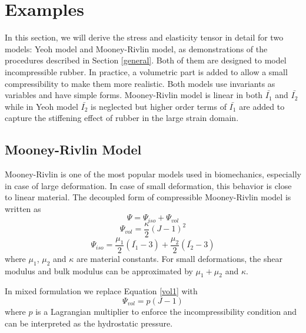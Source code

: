 \section{Examples}
In this section, we will derive the stress and elasticity tensor in detail for two models: Yeoh model and Mooney-Rivlin model, as demonstrations of the procedures described in Section \ref{general}. Both of them are designed to model incompressible rubber. In practice, a volumetric part is added to allow a small compressibility to make them more realistic.  Both models use invariants as variables and have simple forms. Mooney-Rivlin model is linear in both $\bar{I_1}$ and $\bar{I_2}$ while in Yeoh model $\bar{I_2}$ is neglected but higher order terms of $\bar{I_1}$ are added to capture the stiffening effect of rubber in the large strain domain.

%
\subsection{Mooney-Rivlin Model}
Mooney-Rivlin is one of the most popular models used in biomechanics, especially in case of large deformation. In case of small deformation, this behavior is close to linear material. The decoupled form of compressible Mooney-Rivlin model is written as
\begin{equation}
\Psi = \Psi_{iso} + \Psi_{vol}
\end{equation}
\begin{equation} \label{vol1}
\Psi_{vol} = \frac{\kappa}{2}(J - 1)^2
\end{equation}
\begin{equation} \label{iso}
\Psi_{iso} = \frac{\mu_1}{2}(\bar{I_1} - 3) + \frac{\mu_2}{2}(\bar{I_2} - 3)
\end{equation}
where $\mu_1$, $\mu_2$ and $\kappa$ are material constants. For small deformations, the shear modulus and bulk modulus can be approximated by $\mu_1+\mu_2$ and $\kappa$.

In mixed formulation we replace Equation \ref{vol1} with
\begin{equation} \label{vol2}
\Psi_{vol} = p(J - 1)
\end{equation}
where $p$ is a Lagrangian multiplier to enforce the incompressibility condition and can be interpreted as the hydrostatic pressure.  


